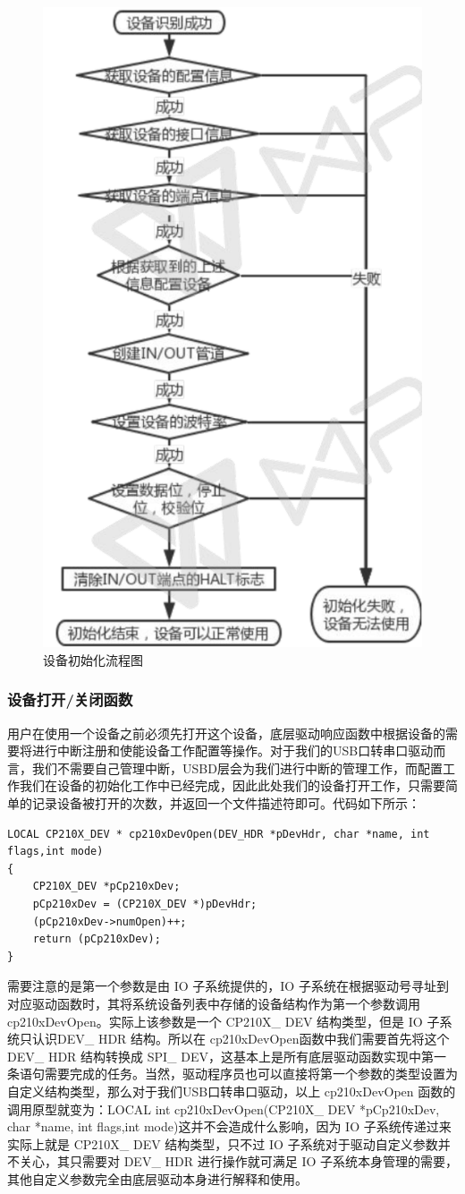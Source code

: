 \begin{figure}[!h]
\centering
\includegraphics[width=.4\textwidth]{./graphics/device-init.pdf}
\caption{设备初始化流程图}\label{fig:device-init}
\end{figure}



\subsubsection{设备打开/关闭函数}

	用户在使用一个设备之前必须先打开这个设备，底层驱动响应函数中根据设备的需要将进行中断注册和使能设备工作配置等操作。对于我们的USB口转串口驱动而言，我们不需要自己管理中断，USBD层会为我们进行中断的管理工作，而配置工作我们在设备的初始化工作中已经完成，因此此处我们的设备打开工作，只需要简单的记录设备被打开的次数，并返回一个文件描述符即可。代码如下所示：
	
\lstset{language=C}
\begin{lstlisting}
LOCAL CP210X_DEV * cp210xDevOpen(DEV_HDR *pDevHdr, char *name, int flags,int mode)
{
	CP210X_DEV *pCp210xDev;
	pCp210xDev = (CP210X_DEV *)pDevHdr;
	(pCp210xDev->numOpen)++;
	return (pCp210xDev);
}
\end{lstlisting}


	需要注意的是第一个参数是由 IO 子系统提供的，IO 子系统在根据驱动号寻址到对应驱动函数时，其将系统设备列表中存储的设备结构作为第一个参数调用 cp210xDevOpen。实际上该参数是一个 CP210X\_ DEV 结构类型，但是 IO 子系统只认识DEV\_ HDR 结构。所以在 cp210xDevOpen函数中我们需要首先将这个 DEV\_ HDR 结构转换成 SPI\_ DEV，这基本上是所有底层驱动函数实现中第一条语句需要完成的任务。当然，驱动程序员也可以直接将第一个参数的类型设置为自定义结构类型，那么对于我们USB口转串口驱动，以上  cp210xDevOpen 函数的调用原型就变为：LOCAL int cp210xDevOpen(CP210X\_ DEV *pCp210xDev, char *name, int flags,int mode)这并不会造成什么影响，因为 IO 子系统传递过来实际上就是 CP210X\_ DEV 结构类型，只不过 IO 子系统对于驱动自定义参数并不关心，其只需要对 DEV\_ HDR 进行操作就可满足 IO 子系统本身管理的需要，其他自定义参数完全由底层驱动本身进行解释和使用。
	
